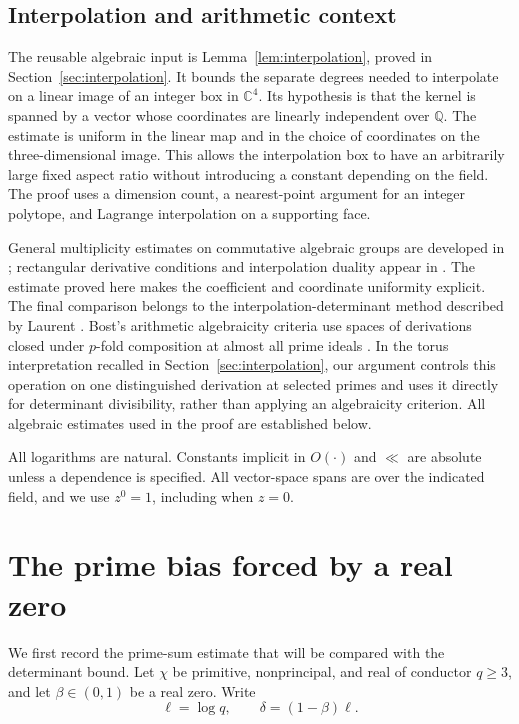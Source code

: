 \documentclass[11pt,a4paper]{amsart}
\theoremstyle{remark}
\newcommand{\Q}{\mathbb Q}
\newcommand{\C}{\mathbb C}
\numberwithin{equation}{section}
\begin{document}
\subsection*{Interpolation and arithmetic context}
The reusable algebraic input is Lemma~\ref{lem:interpolation}, proved
in Section~\ref{sec:interpolation}. It bounds the separate degrees
needed to interpolate on a linear image of an integer box in $\C^4$.
Its hypothesis is that the kernel is spanned by a vector whose
coordinates are linearly independent over $\Q$. The estimate is uniform in the linear
map and in the choice of coordinates on the three-dimensional image.
This allows the interpolation box to have an arbitrarily large fixed
aspect ratio without introducing a constant depending on the field.
The proof uses a dimension count, a nearest-point argument for an
integer polytope, and Lagrange interpolation on a supporting face.

General multiplicity estimates on commutative algebraic groups are
developed in \cite{Philippon}; rectangular derivative conditions
and interpolation duality appear in
\cite[Theorem~1.1 and Lemma~1.3]{Fischler}. The estimate proved here
makes the coefficient and coordinate uniformity explicit. The final
comparison belongs to the interpolation-determinant method described
by Laurent \cite[Section~6]{Laurent}. Bost's arithmetic algebraicity
criteria use spaces of derivations closed under $p$-fold composition
at almost all prime ideals \cite[Theorems~2.1 and 2.3]{Bost}.
In the torus interpretation recalled in Section~\ref{sec:interpolation},
our argument controls this operation on one distinguished derivation
at selected primes and uses it directly for determinant divisibility,
rather than applying an algebraicity criterion. All algebraic estimates
used in the proof are established below.

All logarithms are natural. Constants
implicit in $O(\cdot)$ and $\ll$ are absolute unless a dependence is
specified. All vector-space spans are over the indicated field, and
we use $z^0=1$, including when $z=0$.

\section{The prime bias forced by a real zero}\label{sec:analytic}

We first record the prime-sum estimate that will be compared with the
determinant bound. Let $\chi$ be primitive, nonprincipal, and real of
conductor $q\ge3$, and let $\beta\in(0,1)$ be a real zero. Write
\[
 \ell=\log q,\qquad \delta=(1-\beta)\ell.
\]
\end{document}
